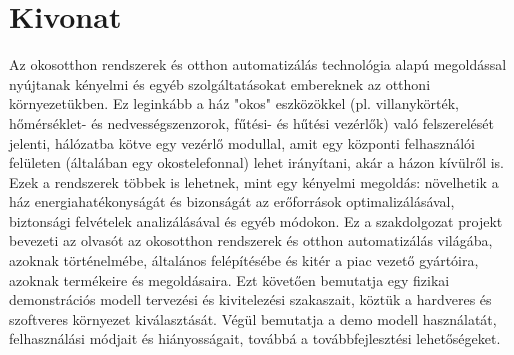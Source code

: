 \setcounter{page}{1}

\selecthungarian

\chapter*{Kivonat}

Az okosotthon rendszerek és otthon automatizálás technológia alapú megoldással nyújtanak kényelmi és egyéb szolgáltatásokat embereknek az otthoni környezetükben. Ez leginkább a ház "okos" eszközökkel (pl. villanykörték, hőmérséklet- és nedvességszenzorok, fűtési- és hűtési vezérlők) való felszerelését jelenti, hálózatba kötve egy vezérlő modullal, amit egy központi felhasználói felületen (általában egy okostelefonnal) lehet irányítani, akár a házon kívülről is. Ezek a rendszerek többek is lehetnek, mint egy kényelmi megoldás: növelhetik a ház energiahatékonyságát és bizonságát az erőforrások optimalizálásával, biztonsági felvételek analizálásával és egyéb módokon. Ez a szakdolgozat projekt bevezeti az olvasót az okosotthon rendszerek és otthon automatizálás világába, azoknak történelmébe, általános felépítésébe és kitér a piac vezető gyártóira, azoknak termékeire és megoldásaira. Ezt követően bemutatja egy fizikai demonstrációs modell tervezési és kivitelezési szakaszait, köztük a hardveres és szoftveres környezet kiválasztását. Végül bemutatja a demo modell használatát, felhasználási módjait és hiányosságait, továbbá a továbbfejlesztési lehetőségeket.


